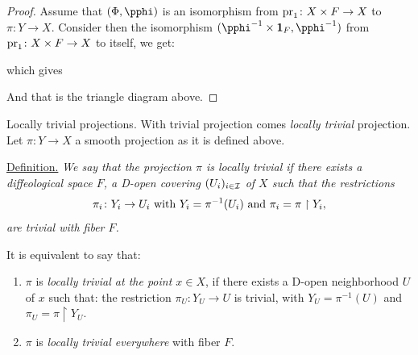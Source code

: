 \begin{proof}
  Assume that $(\Phi, \pphi)$ is an isomorphism from $\operatorname{pr}_1 \colon X \times F \to X$ to $\pi \colon Y \to X$.
  Consider then the isomorphism $(\pphi^{-1} \times \Id_F,\pphi^{-1})$ from $\operatorname{pr}_1 \colon X \times F \to X$ to itself,
  we get:
  \begin{center}
  \end{center}
  which gives
  \begin{center}
  \end{center}
  And that is the triangle diagram above.
\end{proof}

\begin{Article}{Locally trivial projections.}{}
  With trivial projection comes \emph{locally trivial} projection.
  Let $\pi \colon Y \to X$ a smooth projection as it is defined above.

  \uline{Definition.} {\itshape We say that the projection $\pi$ is \emph{locally trivial} if there exists a diffeological space $F$,
  a D-open covering $(U_i)_{i \in \mathcal{I}}$ of $X$ such that the restrictions
  $$%
    \pi_i \colon Y_i \to U_i
    \SpacedText{with}
    Y_i = \pi^{-1}(U_i)
    \SpacedText{and}
    \pi_i = \pi \restriction Y_i,
  $$%
  are trivial with fiber $F$.
  }

  It is equivalent to say that:
  \begin{enumerate}
    \item $\pi$ is \emph{locally trivial at the point $x \in X$},
    if there exists a D-open neighborhood $U$ of $x$ such that:
    the restriction $\pi_U \colon Y_U \to U$ is trivial,
    with $Y_U = \pi^{-1}(U)$ and $\pi_U = \pi \restriction Y_U$.
    \item $\pi$ is \emph{locally trivial everywhere} with fiber $F$.
  \end{enumerate}
\end{Article}

